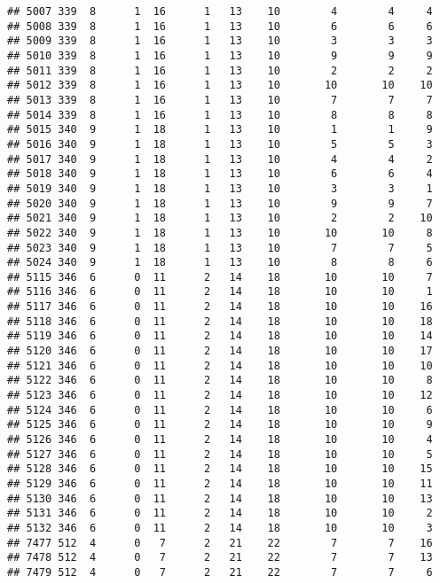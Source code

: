 \documentclass[]{article}
\begin{document}
\begin{verbatim}
## 5007 339  8      1  16      1   13    10        4        4     4
## 5008 339  8      1  16      1   13    10        6        6     6
## 5009 339  8      1  16      1   13    10        3        3     3
## 5010 339  8      1  16      1   13    10        9        9     9
## 5011 339  8      1  16      1   13    10        2        2     2
## 5012 339  8      1  16      1   13    10       10       10    10
## 5013 339  8      1  16      1   13    10        7        7     7
## 5014 339  8      1  16      1   13    10        8        8     8
## 5015 340  9      1  18      1   13    10        1        1     9
## 5016 340  9      1  18      1   13    10        5        5     3
## 5017 340  9      1  18      1   13    10        4        4     2
## 5018 340  9      1  18      1   13    10        6        6     4
## 5019 340  9      1  18      1   13    10        3        3     1
## 5020 340  9      1  18      1   13    10        9        9     7
## 5021 340  9      1  18      1   13    10        2        2    10
## 5022 340  9      1  18      1   13    10       10       10     8
## 5023 340  9      1  18      1   13    10        7        7     5
## 5024 340  9      1  18      1   13    10        8        8     6
## 5115 346  6      0  11      2   14    18       10       10     7
## 5116 346  6      0  11      2   14    18       10       10     1
## 5117 346  6      0  11      2   14    18       10       10    16
## 5118 346  6      0  11      2   14    18       10       10    18
## 5119 346  6      0  11      2   14    18       10       10    14
## 5120 346  6      0  11      2   14    18       10       10    17
## 5121 346  6      0  11      2   14    18       10       10    10
## 5122 346  6      0  11      2   14    18       10       10     8
## 5123 346  6      0  11      2   14    18       10       10    12
## 5124 346  6      0  11      2   14    18       10       10     6
## 5125 346  6      0  11      2   14    18       10       10     9
## 5126 346  6      0  11      2   14    18       10       10     4
## 5127 346  6      0  11      2   14    18       10       10     5
## 5128 346  6      0  11      2   14    18       10       10    15
## 5129 346  6      0  11      2   14    18       10       10    11
## 5130 346  6      0  11      2   14    18       10       10    13
## 5131 346  6      0  11      2   14    18       10       10     2
## 5132 346  6      0  11      2   14    18       10       10     3
## 7477 512  4      0   7      2   21    22        7        7    16
## 7478 512  4      0   7      2   21    22        7        7    13
## 7479 512  4      0   7      2   21    22        7        7     6

\end{verbatim}
\end{document}
